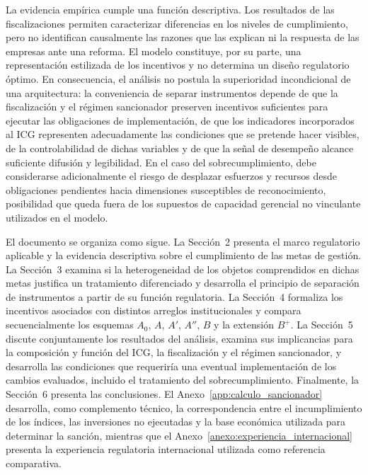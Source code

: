 La evidencia empírica cumple una función descriptiva. Los resultados de las fiscalizaciones permiten caracterizar diferencias en los niveles de cumplimiento, pero no identifican causalmente las razones que las explican ni la respuesta de las empresas ante una reforma. El modelo constituye, por su parte, una representación estilizada de los incentivos y no determina un diseño regulatorio óptimo. En consecuencia, el análisis no postula la superioridad incondicional de una arquitectura: la conveniencia de separar instrumentos depende de que la fiscalización y el régimen sancionador preserven incentivos suficientes para ejecutar las obligaciones de implementación, de que los indicadores incorporados al ICG representen adecuadamente las condiciones que se pretende hacer visibles, de la controlabilidad de dichas variables y de que la señal de desempeño alcance suficiente difusión y legibilidad. En el caso del sobrecumplimiento, debe considerarse adicionalmente el riesgo de desplazar esfuerzos y recursos desde obligaciones pendientes hacia dimensiones susceptibles de reconocimiento, posibilidad que queda fuera de los supuestos de capacidad gerencial no vinculante utilizados en el modelo.

El documento se organiza como sigue. La Sección~2 presenta el marco regulatorio aplicable y la evidencia descriptiva sobre el cumplimiento de las metas de gestión. La Sección~3 examina si la heterogeneidad de los objetos comprendidos en dichas metas justifica un tratamiento diferenciado y desarrolla el principio de separación de instrumentos a partir de su función regulatoria. La Sección~4 formaliza los incentivos asociados con distintos arreglos institucionales y compara secuencialmente los esquemas \(A_0\), \(A\), \(A'\), \(A''\), \(B\) y la extensión \(B^{+}\). La Sección~5 discute conjuntamente los resultados del análisis, examina sus implicancias para la composición y función del ICG, la fiscalización y el régimen sancionador, y desarrolla las condiciones que requeriría una eventual implementación de los cambios evaluados, incluido el tratamiento del sobrecumplimiento. Finalmente, la Sección~6 presenta las conclusiones. El Anexo~\ref{app:calculo_sancionador} desarrolla, como complemento técnico, la correspondencia entre el incumplimiento de los índices, las inversiones no ejecutadas y la base económica utilizada para determinar la sanción, mientras que el Anexo~\ref{anexo:experiencia_internacional} presenta la experiencia regulatoria internacional utilizada como referencia comparativa.
